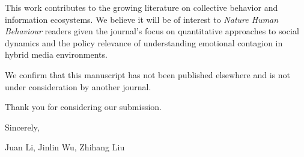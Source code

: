 \documentclass[11pt]{article}
\begin{document}
This work contributes to the growing literature on collective behavior and information ecosystems. We believe it will be of interest to \textit{Nature Human Behaviour} readers given the journal's focus on quantitative approaches to social dynamics and the policy relevance of understanding emotional contagion in hybrid media environments.

We confirm that this manuscript has not been published elsewhere and is not under consideration by another journal.

Thank you for considering our submission.

Sincerely,

Juan Li, Jinlin Wu, Zhihang Liu
\end{document}
